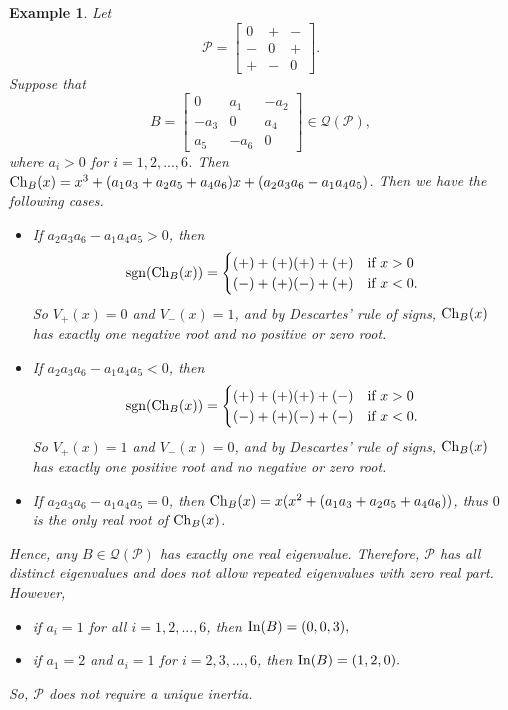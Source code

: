 \documentclass[a4paper, 10pt]{article}
\newtheorem{eg}{Example}[section]
\numberwithin{equation}{section}
\def\sgn{{\rm sgn}}
\def\In{{\rm In}}
\def\Ch{{\rm Ch}}
\begin{document}
	\begin{eg}\label{example2.6}
		Let $$\mathcal{P}=\begin{bmatrix}
			0&+&-\\-&0&+\\+&-&0
		\end{bmatrix}.$$ Suppose that $$B=\begin{bmatrix}
			0&a_1&-a_2\\-a_3&0&a_4\\a_5&-a_6&0
		\end{bmatrix}\in \mathcal{Q}(\mathcal{P}),$$
		where $a_i>0$ for $i=1,2,...,6$. Then $\Ch_B(x)=x^3+(a_1a_3+a_2a_5+a_4a_6)x+(a_2a_3a_6-a_1a_4a_5)$. Then we have the following cases.
		\begin{itemize}
			\item[i.] If $a_2a_3a_6-a_1a_4a_5>0$, then
			$$
			\sgn(\Ch_B(x)) = \begin{cases} 
				(+)+(+)(+)+(+) & \text{if} ~ x> 0 \\
				(-)+(+)(-)+(+) & \text{if} ~x<0.
			\end{cases}
			$$
			So $V_+(x)=0$ and $V_-(x)=1$, and by Descartes' rule of signs, $\Ch_B(x)$ has exactly one negative root and no positive or zero root.
			\item[ii.] If $a_2a_3a_6-a_1a_4a_5<0$, then
			$$
			\sgn(\Ch_B(x)) = \begin{cases} 
				(+)+(+)(+)+(-) & \text{if} ~ x> 0 \\
				(-)+(+)(-)+(-) & \text{if} ~x<0.
			\end{cases}
			$$
			So $V_+(x)=1$ and $V_-(x)=0$, and by Descartes' rule of signs, $\Ch_B(x)$ has exactly one positive root and no negative or zero root.
			\item[iii.] If $a_2a_3a_6-a_1a_4a_5=0$, then
			$\Ch_B(x)=x(x^2+(a_1a_3+a_2a_5+a_4a_6))$, thus $0$ is the only real root of $\Ch_B(x)$.
		\end{itemize} Hence, any $B\in \mathcal{Q}(\mathcal{P})$ has exactly one real eigenvalue. Therefore, $\mathcal{P}$ has all distinct eigenvalues and does not allow repeated eigenvalues with zero real part. However,
		\begin{itemize}
			\item[i.] if $a_i=1$ for all $i=1,2,...,6$, then $\In(B)=(0,0,3),$
			\item[ii.] if $a_1=2$ and $a_i=1$ for $i=2,3,...,6$, then $\In(B)=(1,2,0).$
		\end{itemize}
		So, $\mathcal{P}$ does not require a unique inertia. 
	\end{eg}
	
\end{document}
